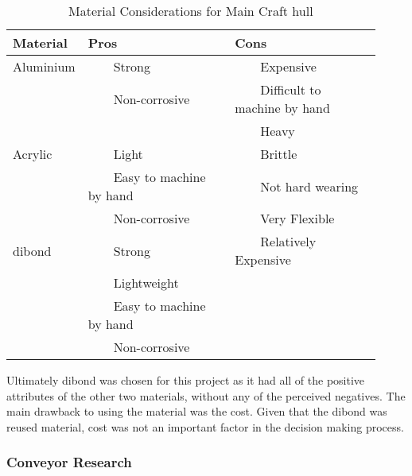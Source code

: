 \documentclass [12pt]{article}
\newcommand{\tabitem}{~~\llap{\textbullet}~~}
\begin{document}
\begin{table}[H]
\centering
\setlength{\arrayrulewidth}{1.5pt}
\begin{tabular}{|p{0.12\linewidth}|p{0.4\linewidth}|p{0.4\linewidth}|}
\hline
\cellcolor{gray!40} Material & \cellcolor{gray!40}Pros & \cellcolor{gray!40} Cons \\ 
\hline
\cellcolor{gray!20} Aluminium & \cellcolor{gray!20} \tabitem Strong & \cellcolor{gray!20} \tabitem Expensive\\
\cellcolor{gray!20} & \cellcolor{gray!20} \tabitem Non-corrosive & \cellcolor{gray!20}  \tabitem Difficult to machine by hand \\
\cellcolor{gray!20} & \cellcolor{gray!20}  & \cellcolor{gray!20}  \tabitem Heavy \\
\hline
\cellcolor{gray!20} Acrylic & \cellcolor{gray!20} \tabitem Light & \cellcolor{gray!20} \tabitem Brittle\\
\cellcolor{gray!20}  & \cellcolor{gray!20} \tabitem Easy to machine by hand & \cellcolor{gray!20} \tabitem Not hard wearing \\
\cellcolor{gray!20}  & \cellcolor{gray!20} \tabitem Non-corrosive & \cellcolor{gray!20} \tabitem Very Flexible\\
\hline
\cellcolor{gray!20} \gls{dibond} & \cellcolor{gray!20} \tabitem Strong & \cellcolor{gray!20} \tabitem Relatively Expensive \\
\cellcolor{gray!20}  & \cellcolor{gray!20} \tabitem Lightweight  & \cellcolor{gray!20} \\
\cellcolor{gray!20}  & \cellcolor{gray!20} \tabitem Easy to machine by hand & \cellcolor{gray!20} \\
\cellcolor{gray!20}  & \cellcolor{gray!20}  \tabitem Non-corrosive & \cellcolor{gray!20} \\
\hline
\end{tabular}
\caption{Material Considerations for Main Craft hull}
\label{table:materials_analysis}
\end{table} 

Ultimately \gls{dibond} \cite{Dibond} was chosen for this project as it had all of the positive attributes of the other two materials, without any of the perceived negatives. The main drawback to using the material was the cost. Given that the \gls{dibond} was reused material, cost was not an important factor in the decision making process. 

\subsubsection{Conveyor Research}
\end{document}
